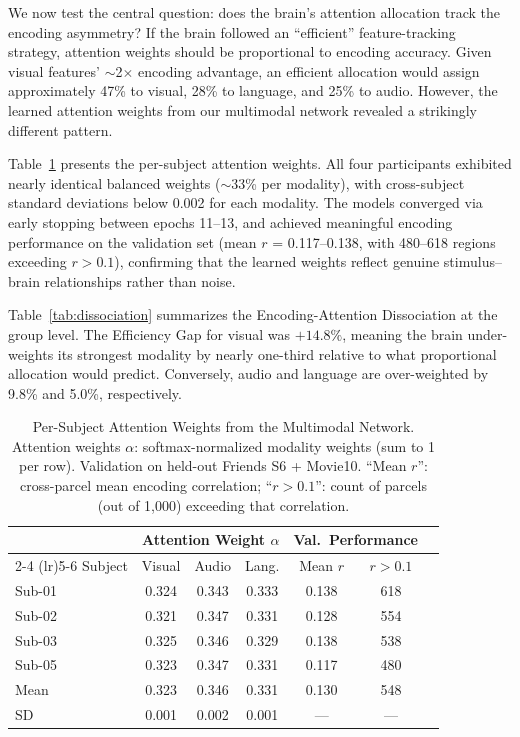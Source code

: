\documentclass[conference]{IEEEtran}
\begin{document}
We now test the central question: does the brain's attention allocation track the encoding asymmetry? If the brain followed an ``efficient'' feature-tracking strategy, attention weights should be proportional to encoding accuracy. Given visual features' $\sim$2$\times$ encoding advantage, an efficient allocation would assign approximately 47\% to visual, 28\% to language, and 25\% to audio. However, the learned attention weights from our multimodal network revealed a strikingly different pattern.

Table~\ref{tab:attn_per_subject} presents the per-subject attention weights. All four participants exhibited nearly identical balanced weights ($\sim$33\% per modality), with cross-subject standard deviations below 0.002 for each modality. The models converged via early stopping between epochs 11--13, and achieved meaningful encoding performance on the validation set (mean $r$ = 0.117--0.138, with 480--618 regions exceeding $r > 0.1$), confirming that the learned weights reflect genuine stimulus--brain relationships rather than noise.

Table~\ref{tab:dissociation} summarizes the Encoding-Attention Dissociation at the group level. The Efficiency Gap for visual was $+14.8\%$, meaning the brain under-weights its strongest modality by nearly one-third relative to what proportional allocation would predict. Conversely, audio and language are over-weighted by 9.8\% and 5.0\%, respectively.

\begin{table}[t]
\caption{Per-Subject Attention Weights from the Multimodal Network. Attention weights $\alpha$: softmax-normalized modality weights (sum to 1 per row). Validation on held-out Friends S6 + Movie10. ``Mean $r$'': cross-parcel mean encoding correlation; ``$r > 0.1$'': count of parcels (out of 1{,}000) exceeding that correlation.}
\label{tab:attn_per_subject}
\centering
\begin{tabular*}{\columnwidth}{@{\extracolsep{\fill}}lcccccc@{}}
\toprule
 & \multicolumn{3}{c}{Attention Weight $\alpha$} & \multicolumn{2}{c}{Val.\ Performance} \\
\cmidrule(lr){2-4} \cmidrule(lr){5-6}
Subject & Visual & Audio & Lang. & Mean $r$ & $r\!>\!0.1$ \\
\midrule
Sub-01 & 0.324 & 0.343 & 0.333 & 0.138 & 618 \\
Sub-02 & 0.321 & 0.347 & 0.331 & 0.128 & 554 \\
Sub-03 & 0.325 & 0.346 & 0.329 & 0.138 & 538 \\
Sub-05 & 0.323 & 0.347 & 0.331 & 0.117 & 480 \\
\midrule
Mean & 0.323 & 0.346 & 0.331 & 0.130 & 548 \\
SD & 0.001 & 0.002 & 0.001 & --- & --- \\
\bottomrule
\end{tabular*}
\end{table}
\end{document}
